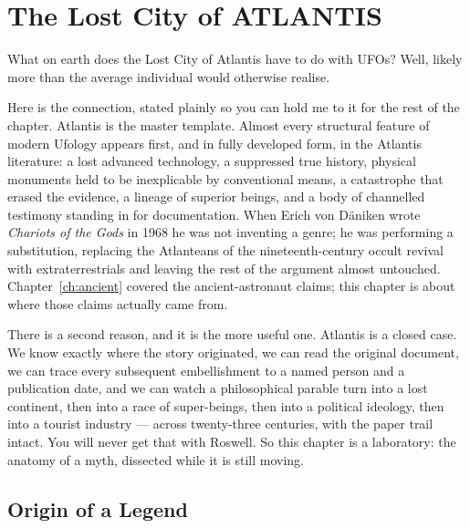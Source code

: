 \chapter{The Lost City of ATLANTIS}\label{ch:atlantis}


What on earth does the Lost City of Atlantis have to do with UFOs? Well, likely more than the
average individual would otherwise realise.

Here is the connection, stated plainly so you can hold me to it for the rest of the chapter. Atlantis
is the master template. Almost every structural feature of modern Ufology appears first, and in
fully developed form, in the Atlantis literature: a lost advanced technology, a suppressed true
history, physical monuments held to be inexplicable by conventional means, a catastrophe that erased
the evidence, a lineage of superior beings, and a body of channelled testimony standing in for
documentation. When Erich von Däniken wrote \emph{Chariots of the Gods} in 1968 he was not inventing
a genre; he was performing a substitution, replacing the Atlanteans of the nineteenth-century
occult revival with extraterrestrials and leaving the rest of the argument almost untouched.
Chapter~\ref{ch:ancient} covered the ancient-astronaut claims; this chapter is about where those
claims actually came from.

There is a second reason, and it is the more useful one. Atlantis is a closed case. We know exactly
where the story originated, we can read the original document, we can trace every subsequent
embellishment to a named person and a publication date, and we can watch a philosophical parable
turn into a lost continent, then into a race of super-beings, then into a political ideology, then
into a tourist industry --- across twenty-three centuries, with the paper trail intact. You will
never get that with Roswell. So this chapter is a laboratory: the anatomy of a myth, dissected while
it is still moving.

\section{Origin of a Legend}\label{sec:originlegend}

